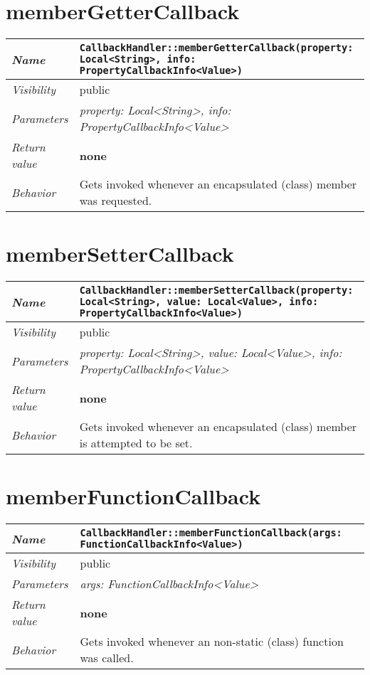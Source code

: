  \section{memberGetterCallback}
\begin{longtable}{p{3cm} @{\hskip 1cm} p{12cm}}
 \hline
\textit{Name} & \texttt{CallbackHandler::memberGetterCallback(property: Local<String>, info: PropertyCallbackInfo<Value>)}\\
\hline
 \textit{Visibility} & public\\
\hline
\textit{Parameters} & \textit{property: Local<String>, info: PropertyCallbackInfo<Value>}\\
\hline
\textit{Return value} & \textbf{none}\\
  \hline
 \textit{Behavior} & Gets invoked whenever an encapsulated (class) member was requested.\\
\hline
\end{longtable}
 \section{memberSetterCallback}
\begin{longtable}{p{3cm} @{\hskip 1cm} p{12cm}}
 \hline
\textit{Name} & \texttt{CallbackHandler::memberSetterCallback(property: Local<String>, value: Local<Value>, info: PropertyCallbackInfo<Value>)}\\
\hline
 \textit{Visibility} & public\\
\hline
\textit{Parameters} & \textit{property: Local<String>, value: Local<Value>, info: PropertyCallbackInfo<Value>}\\
\hline
\textit{Return value} & \textbf{none}\\
  \hline
 \textit{Behavior} & Gets invoked whenever an encapsulated (class) member is attempted to be set.\\
\hline
\end{longtable}
 \section{memberFunctionCallback}
\begin{longtable}{p{3cm} @{\hskip 1cm} p{12cm}}
 \hline
\textit{Name} & \texttt{CallbackHandler::memberFunctionCallback(args: FunctionCallbackInfo<Value>)}\\
\hline
 \textit{Visibility} & public\\
\hline
\textit{Parameters} & \textit{args: FunctionCallbackInfo<Value>}\\
\hline
\textit{Return value} & \textbf{none}\\
  \hline
 \textit{Behavior} & Gets invoked whenever an non-static (class) function was called.\\
\hline
\end{longtable} \pagebreak

